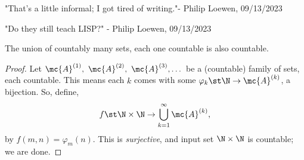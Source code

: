 \begin{nquote}{}
	"That's a little informal; I got tired of writing."- Philip Loewen, 09/13/2023
	
	\medskip
	
	"Do they still teach LISP?" - Philip Loewen, 09/13/2023
\end{nquote}

\begin{claim}
	The union of countably many sets, each one countable is also countable.
\end{claim}
\begin{proof}
	Let \(\mc{A}^{(1)},~\mc{A}^{(2)},~\mc{A}^{(3)},\dots\) be a (countable) family of sets, each countable. This means each \(k\) comes with some \(\varphi_k\st\N\to \mc{A}^{(k)}\), a bijection. So, define,
	\begin{equation*}
		f\st\N\times\N \to \bigcup_{k=1}^{\infty}\mc{A}^{(k)},
	\end{equation*}
	by \(f(m,n)=\varphi_m(n)\). This is \emph{surjective}, and input set \(\N\times\N\) is countable; we are done.
\end{proof}


